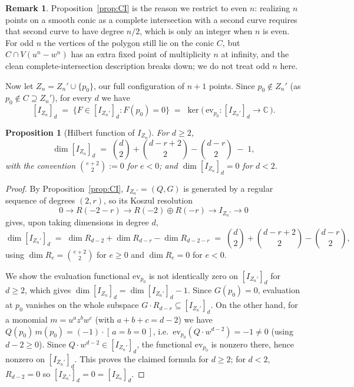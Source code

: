 \documentclass[11pt]{amsart}
\theoremstyle{plain}
\newtheorem{proposition}[theorem]{Proposition}
\theoremstyle{definition}
\newtheorem{remark}[theorem]{Remark}
\newcommand{\CC}{\mathbb{C}}
\begin{document}
\begin{remark}
Proposition~\ref{prop:CI} is the reason we restrict to even $n$: realizing $n$ points on a smooth conic as a complete intersection with a second curve requires that second curve to have degree $n/2$, which is only an integer when $n$ is even. For odd $n$ the vertices of the polygon still lie on the conic $C$, but $C\cap V(u^n-w^n)$ has an extra fixed point of multiplicity $n$ at infinity, and the clean complete-intersection description breaks down; we do not treat odd $n$ here.
\end{remark}

Now let $Z_n=Z_n'\cup\{p_0\}$, our full configuration of $n+1$ points. Since $p_0\notin Z_n'$ (as $p_0\notin C\supseteq Z_n'$), for every $d$ we have
\[
[I_{Z_n}]_d \;=\; \{F\in [I_{Z_n'}]_d : F(p_0)=0\} \;=\; \ker\big(\,\mathrm{ev}_{p_0}: [I_{Z_n'}]_d\to\CC\,\big).
\]

\begin{proposition}[Hilbert function of $I_{Z_n}$]\label{prop:hilbert}
For $d\ge2$,
\[
\dim [I_{Z_n}]_d \;=\; \binom{d}{2} + \binom{d-r+2}{2} - \binom{d-r}{2} \;-\;1,
\]
with the convention $\binom{e+2}{2}:=0$ for $e<0$; and $\dim[I_{Z_n}]_d=0$ for $d<2$.
\end{proposition}

\begin{proof}
By Proposition~\ref{prop:CI}, $I_{Z_n'}=(Q,G)$ is generated by a regular sequence of degrees $(2,r)$, so its Koszul resolution
\[
0\to R(-2-r)\to R(-2)\oplus R(-r) \to I_{Z_n'} \to 0
\]
gives, upon taking dimensions in degree $d$,
\[
\dim[I_{Z_n'}]_d \;=\; \dim R_{d-2} + \dim R_{d-r} - \dim R_{d-2-r} \;=\; \binom{d}{2}+\binom{d-r+2}{2}-\binom{d-r}{2},
\]
using $\dim R_e=\binom{e+2}{2}$ for $e\ge0$ and $\dim R_e=0$ for $e<0$.

We show the evaluation functional $\mathrm{ev}_{p_0}$ is not identically zero on $[I_{Z_n'}]_d$ for $d\ge2$, which gives $\dim[I_{Z_n}]_d=\dim[I_{Z_n'}]_d - 1$. Since $G(p_0)=0$, evaluation at $p_0$ vanishes on the whole subspace $G\cdot R_{d-r}\subseteq [I_{Z_n'}]_d$. On the other hand, for a monomial $m=u^az^b w^c$ (with $a+b+c=d-2$) we have $Q(p_0)\,m(p_0) = (-1)\cdot[\,a=b=0\,]$, i.e.\ $\mathrm{ev}_{p_0}(Q\cdot w^{d-2}) = -1 \ne 0$ (using $d-2\ge0$). Since $Q\cdot w^{d-2}\in [I_{Z_n'}]_d$, the functional $\mathrm{ev}_{p_0}$ is nonzero there, hence nonzero on $[I_{Z_n'}]_d$. This proves the claimed formula for $d\ge2$; for $d<2$, $R_{d-2}=0$ so $[I_{Z_n'}]_d=0=[I_{Z_n}]_d$.
\end{proof}
\end{document}
